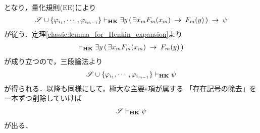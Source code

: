 \begin{sketch}
\begin{align}
		\end{align}
		となり，量化規則(EE)により
		\begin{align}
			\mathscr{S} \cup \{\varphi_{i_{1}},\cdots,\varphi_{i_{m-1}}\} 
			\vdash_{{\scriptsize \mbox{{\bf HK}}}} 
			\exists y\, (\, \exists x_{m} F_{m}(x_{m}) \hspace{0.25em}\rightarrow\hspace{0.25em} F_{m}(y)\, ) \hspace{0.25em}\rightarrow\hspace{0.25em} \psi
		\end{align}
		が従う．定理\ref{classic:lemma_for_Henkin_expansion}より
		\begin{align}
			\vdash_{{\scriptsize \mbox{{\bf HK}}}} 
			\exists y\, (\, \exists x_{m} F_{m}(x_{m}) \hspace{0.25em}\rightarrow\hspace{0.25em} F_{m}(y)\, )
		\end{align}
		が成り立つので，三段論法より
		\begin{align}
			\mathscr{S} \cup \{\varphi_{i_{1}},\cdots,\varphi_{i_{m-1}}\} 
			\vdash_{{\scriptsize \mbox{{\bf HK}}}} \psi
		\end{align}
		が得られる．以降も同様にして，極大な主要$\varepsilon$項が属する
		「存在記号の除去」を一本ずつ削除していけば
		\begin{align}
			\mathscr{S} \vdash_{{\scriptsize \mbox{{\bf HK}}}} \psi
		\end{align}
		が出る．
		\QED
	\end{sketch}
	
